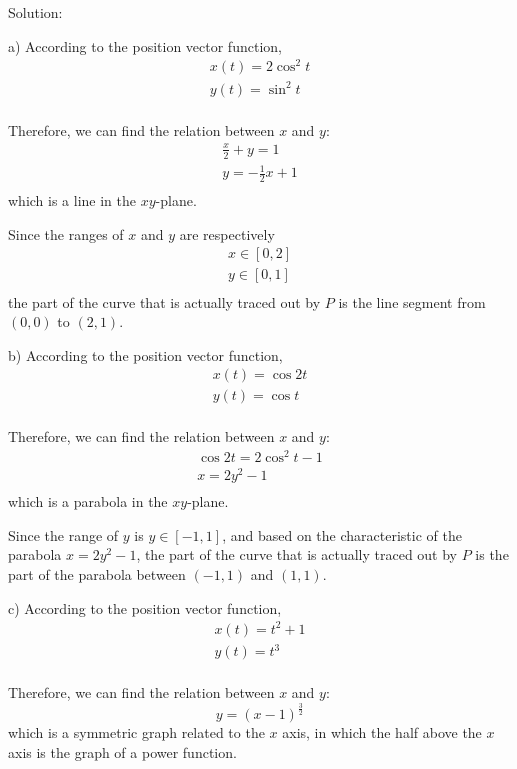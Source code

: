 \documentclass{article}
\begin{document}
Solution:

a) According to the position vector function,
\begin{gather*}
  x(t) = 2 \cos^2 t \\
  y(t) = \sin^2 t \\
\end{gather*}

Therefore, we can find the relation between $x$ and $y$:
\begin{gather*}
  \frac{x}{2} + y = 1 \\
  y = -\frac{1}{2}x + 1 \\
\end{gather*}
which is a line in the $xy$-plane.

Since the ranges of $x$ and $y$ are respectively
\begin{gather*}
  x \in [0, 2] \\
  y \in [0, 1] \\
\end{gather*}
the part of the curve that is actually traced out by $P$ is the line segment 
from $(0, 0)$ to $(2, 1)$.

b) According to the position vector function,
\begin{gather*}
  x(t) = \cos 2t \\
  y(t) = \cos t \\
\end{gather*}

Therefore, we can find the relation between $x$ and $y$:
\begin{gather*}
  \cos 2t = 2 \cos^2 t - 1 \\
  x = 2 y^2 - 1 \\
\end{gather*}
which is a parabola in the $xy$-plane.

Since the range of $y$ is $y \in [-1, 1]$, and based on the characteristic of 
the parabola $x = 2 y^2 - 1$, the part of the curve that is actually traced out 
by $P$ is the part of the parabola between $(-1, 1)$ and $(1, 1)$.

c) According to the position vector function,
\begin{gather*}
  x(t) = t^2 + 1 \\
  y(t) = t^3 \\
\end{gather*}

Therefore, we can find the relation between $x$ and $y$:
\begin{equation*}
  y = (x - 1)^{\frac{3}{2}}
\end{equation*}
which is a symmetric graph related to the $x$ axis, in which the half above the 
$x$ axis is the graph of a power function.
\end{document}
